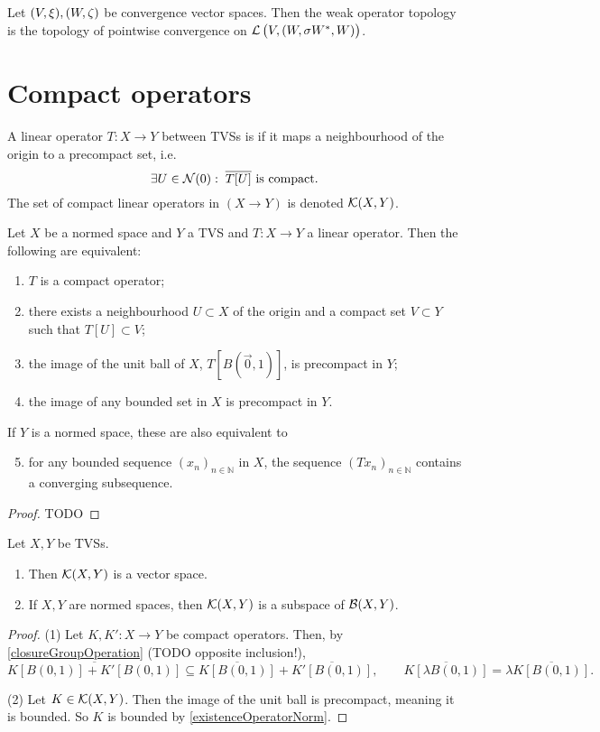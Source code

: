 \begin{lemma}
Let $\sSet{V, \xi}, \sSet{W,\zeta}$ be convergence vector spaces. Then the weak operator topology is the topology of pointwise convergence on $\contLin\big(V, \sSet{W, \sigma{\dual{W}, W}}\big)$.
\end{lemma}

\section{Compact operators}
\begin{definition}
A linear operator $T:X\to Y$ between TVSs is  if it maps a neighbourhood of the origin to a precompact set, i.e.\ 
\[ \exists U \in \operatorname{\mathcal{N}}(0): \;  \text{$\overline{T[U]}$ is compact.} \]
The set of compact linear operators in $(X\to Y)$ is denoted $\operatorname{\mathcal{K}}(X,Y)$.
\end{definition}

\begin{lemma} \label{compactOperatorEquivalents}
Let $X$ be a normed space and $Y$ a TVS and $T:X\to Y$ a linear operator. Then the following are equivalent:
\begin{enumerate}
\item $T$ is a compact operator;
\item there exists a neighbourhood $U \subset X$ of the origin and a compact set $V\subset Y$ such that $T[U] \subset V$;
\item the image of the unit ball of $X$, $T[B(\vec{0},1)]$, is precompact in $Y$;
\item the image of any bounded set in $X$ is precompact in $Y$.
\end{enumerate}
If $Y$ is a normed space, these are also equivalent to
\begin{enumerate} \setcounter{enumi}{4}
\item for any bounded sequence $(x_{n})_{n\in \mathbb{N}}$ in $X$, the sequence $(Tx_{n})_{n\in \mathbb{N} }$ contains a converging subsequence.
\end{enumerate}
\end{lemma}
\begin{proof}
TODO
\end{proof}


\begin{lemma}
Let $X,Y$ be TVSs.
\begin{enumerate}
\item Then $\operatorname{\mathcal{K}}(X, Y)$ is a vector space.
\item If $X,Y$ are normed spaces, then $\operatorname{\mathcal{K}}(X, Y)$ is a subspace of $\operatorname{\mathcal{B}}(X, Y)$.
\end{enumerate}
\end{lemma}
\begin{proof}
(1) Let $K,K':X\to Y$ be compact operators. Then, by \ref{closureGroupOperation} (TODO opposite inclusion!),
\[ \overline{K[B(0, 1)]+K'[B(0, 1)]} \subseteq \overline{K[B(0, 1)]}+\overline{K'[B(0, 1)]}, \qquad \overline{K[\lambda B(0, 1)]} = \lambda\overline{K[B(0, 1)]}. \]

(2) Let $K\in\operatorname{\mathcal{K}}(X, Y)$. Then the image of the unit ball is precompact, meaning it is bounded. So $K$ is bounded by \ref{existenceOperatorNorm}.
\end{proof}

